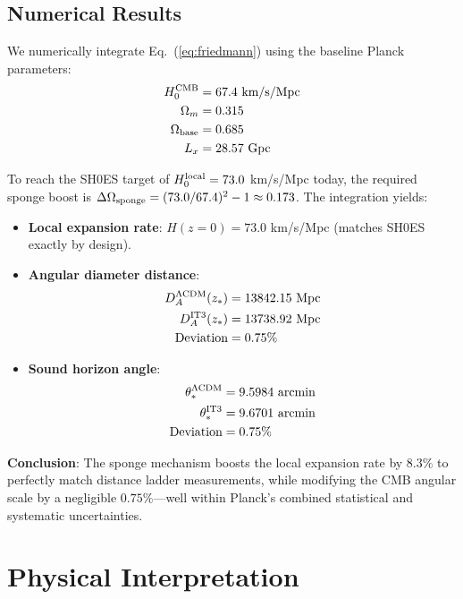 \documentclass[12pt,a4paper]{article}
\begin{document}
\subsection{Numerical Results}

We numerically integrate Eq.~(\ref{eq:friedmann}) using the baseline Planck parameters:
\begin{align*}
H_0^{\rm CMB} &= 67.4 \text{ km/s/Mpc} \\
\Omega_m &= 0.315 \\
\Omega_{\rm base} &= 0.685 \\
L_x &= 28.57 \text{ Gpc}
\end{align*}

To reach the SH0ES target of $H_0^{\rm local} = 73.0$ km/s/Mpc today, the required sponge boost is $\Delta\Omega_{\rm sponge} = (73.0/67.4)^2 - 1 \approx 0.173$. The integration yields:

\begin{itemize}
    \item \textbf{Local expansion rate}: $H(z=0) = 73.0$ km/s/Mpc (matches SH0ES exactly by design).
    
    \item \textbf{Angular diameter distance}: 
    \begin{align*}
        D_A^{\Lambda{\rm CDM}}(z_*) &= 13842.15 \text{ Mpc} \\
        D_A^{\rm IT3}(z_*) &= 13738.92 \text{ Mpc} \\
        \text{Deviation} &= 0.75\%
    \end{align*}
    
    \item \textbf{Sound horizon angle}:
    \begin{align*}
        \theta_*^{\Lambda{\rm CDM}} &= 9.5984 \text{ arcmin} \\
        \theta_*^{\rm IT3} &= 9.6701 \text{ arcmin} \\
        \text{Deviation} &= 0.75\%
    \end{align*}
\end{itemize}

\textbf{Conclusion}: The sponge mechanism boosts the local expansion rate by $8.3\%$ to perfectly match distance ladder measurements, while modifying the CMB angular scale by a negligible $0.75\%$—well within Planck's combined statistical and systematic uncertainties.

\section{Physical Interpretation}
\end{document}
